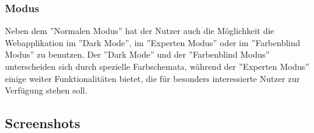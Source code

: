 \subsubsection{Modus}
Neben dem ''Normalen Modus'' hat der Nutzer auch die Möglichkeit die Webapplikation im ''Dark Mode'', im ''Experten Modus'' oder im ''Farbenblind Modus'' zu benutzen.
Der ''Dark Mode'' und der ''Farbenblind Modus'' unterscheiden sich durch spezielle Farbschemata, während der ''Experten Modus'' einige weiter Funktionalitäten bietet, die für besonders interessierte Nutzer zur Verfügung stehen soll. 

\subsection{Screenshots}
\label{Screenshots}

